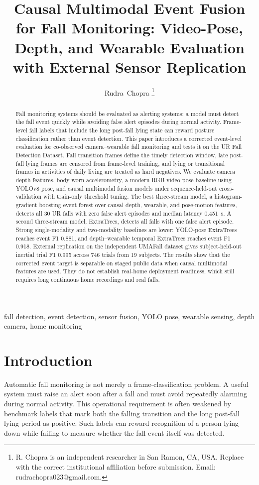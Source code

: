 \documentclass[journal]{IEEEtran}
\title{Causal Multimodal Event Fusion for Fall Monitoring: Video-Pose, Depth, and Wearable Evaluation with External Sensor Replication}
\author{Rudra~Chopra%
\thanks{R. Chopra is an independent researcher in San Ramon, CA, USA. Replace with the correct institutional affiliation before submission. Email: rudrachopra023@gmail.com.}}
\begin{document}
\maketitle

\begin{abstract}
Fall monitoring systems should be evaluated as alerting systems: a model must detect the fall event quickly while avoiding false alert episodes during normal activity. Frame-level fall labels that include the long post-fall lying state can reward posture classification rather than event detection. This paper introduces a corrected event-level evaluation for co-observed camera--wearable fall monitoring and tests it on the UR Fall Detection Dataset. Fall transition frames define the timely detection window, late post-fall lying frames are censored from frame-level training, and lying or transitional frames in activities of daily living are treated as hard negatives. We evaluate camera depth features, body-worn accelerometry, a modern RGB video-pose baseline using YOLOv8 pose, and causal multimodal fusion models under sequence-held-out cross-validation with train-only threshold tuning. The best three-stream model, a histogram-gradient boosting event forest over causal depth, wearable, and pose-motion features, detects all 30 UR falls with zero false alert episodes and median latency \SI{0.451}{s}. A second three-stream model, ExtraTrees, detects all falls with one false alert episode. Strong single-modality and two-modality baselines are lower: YOLO-pose ExtraTrees reaches event F1 0.881, and depth--wearable temporal ExtraTrees reaches event F1 0.918. External replication on the independent UMAFall dataset gives subject-held-out inertial trial F1 0.995 across 746 trials from 19 subjects. The results show that the corrected event target is separable on staged public data when causal multimodal features are used. They do not establish real-home deployment readiness, which still requires long continuous home recordings and real falls.
\end{abstract}

\begin{IEEEkeywords}
fall detection, event detection, sensor fusion, YOLO pose, wearable sensing, depth camera, home monitoring
\end{IEEEkeywords}

\section{Introduction}
Automatic fall monitoring is not merely a frame-classification problem. A useful system must raise an alert soon after a fall and must avoid repeatedly alarming during normal activity. This operational requirement is often weakened by benchmark labels that mark both the falling transition and the long post-fall lying period as positive. Such labels can reward recognition of a person lying down while failing to measure whether the fall event itself was detected.
\end{document}
